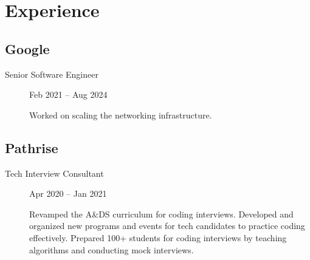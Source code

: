 \documentclass[letterpaper,10pt,oneside]{article}
\begin{document}
\section*{Experience}
\subsection*{Google}
\vspace{-3px}
\begin{description}
	\item[Senior Software Engineer]\hfill Feb 2021 -- Aug 2024
	
	Worked on scaling the networking infrastructure.
	

\end{description}

\subsection*{Pathrise}
\vspace{-3px}
\begin{description}
	\item[Tech Interview Consultant]\hfill Apr 2020 -- Jan 2021
	
	Revamped the A\&DS curriculum for coding interviews. Developed and organized new programs and events for tech candidates to practice coding effectively. Prepared 100+ students for coding interviews by teaching algorithms and conducting mock interviews.
\end{description}
\end{document}
